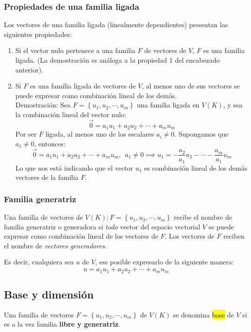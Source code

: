 \subsubsection{Propiedades de una familia ligada}

Los vectores de una familia ligada (linealmente dependientes) presentan las siguientes propiedades:
\begin{enumerate}
  \item Si el vector nulo pertenece a una familia \(F\) de vectores de \(V\), \(F\) es una familia ligada. (La demostración es análoga a la propiedad 1 del encabezado anterior).
  \item Si \(F\) es una familia ligada de vectores de \(V\), al menos uno de sus vectores se puede expresar como combinación lineal de los demás. \\ Demostración: Sea \(F=\left\{u_1, u_2, \cdots, u_m\right\}\) una familia ligada en \(V(K)\), y sea la combinación lineal del vector nulo:\[
    \vec{0} = a_1 u_1 + a_2 u_2 + \cdots + a_m u_m
  \]
  Por ser \(F\) ligada, al menos uno de los escalares \(a_i \neq 0\). Supongamos que \(a_1 \neq 0\), entonces: \[
    \vec{0} = a_1 u_1 + a_2 u_2 + \cdots + a_m u_m, ~~ a_1 \neq 0 \implies u_1 = -\frac{a_2}{a_1}u_2 - \cdots - \frac{a_m}{a_1}u_m
  \]
  Lo que nos está indicando que el vector \(u_1\) es combinación lineal de los demás vectores de la familia \(F\).
\end{enumerate}

\subsubsection{Familia generatriz}

Una familia de vectores de \(V(K): F=\left\{u_1,u_2,\cdots,u_m\right\}\) recibe el nombre de familia generatriz o generadora si \textit{todo} vector del espacio vectorial \(V\) se puede expresar como combinación lineal de los vectores de \(F\). Los vectores de \(F\) reciben el nombre de \textit{vectores generadores}.

Es decir, cualquiera sea \(u\) de \(V\), ess posible expresarlo de la siguiente manera:\[
  u = a_1 u_1 + a_2 u_2 + \cdots + a_m u_m
\]

\subsection{Base y dimensión}

Una familia de vectores \(F = \left\{u_1, u_2, \cdots, u_m\right\}\) de \(V(K)\) se denomina \hl{base} de \(V\) si es a la vez familia \textbf{libre y generatriz}.

